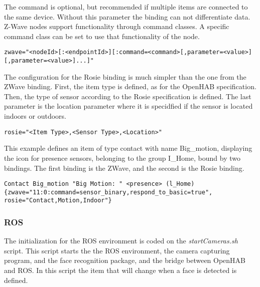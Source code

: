 The command is optional, but recommended if multiple items are connected to the same device. Without this parameter the binding can not differentiate data. Z-Wave nodes support functionality through command classes. A specific command class can be set to use that functionality of the node. 


\begin{lstlisting}[caption=Item configuration sintax,label={lst:itemsZWave}]
zwave="<nodeId>[:<endpointId>][:command=<command>[,parameter=<value>][,parameter=<value>]...]"
\end{lstlisting}

The configuration for the Rosie binding is  much simpler than the one from the ZWave binding. First, the item type is defined, as for the OpenHAB specification. Then, the type of sensor according to the Rosie specification is defined. The last parameter is the location parameter where it is specidfied if the sensor is located indoors or outdoors. 

\begin{lstlisting}[caption=Item configuration sintax,label={lst:itemsRosie}]
rosie="<Item Type>,<Sensor Type>,<Location>"
\end{lstlisting}

This example defines an item of type contact with name Big\_motion, displaying the icon for presence sensors, belonging to the group I\_Home, bound by two bindings. The first binding is the ZWave, and the second is the Rosie binding.

\begin{lstlisting}[caption=Item configuration sintax,label={lst:itemsExample}]
Contact Big_motion "Big Motion: " <presence> (l_Home) {zwave="11:0:command=sensor_binary,respond_to_basic=true", rosie="Contact,Motion,Indoor"}
\end{lstlisting}


\subsubsection{ROS}
The initialization for the ROS environment is coded on the \textit{startCameras.sh} script. This script starts the the ROS environment, the camera capturing program, and the face recognition package, and the bridge between OpenHAB and ROS. In this script the item that will change when a face is detected is defined. 

	

